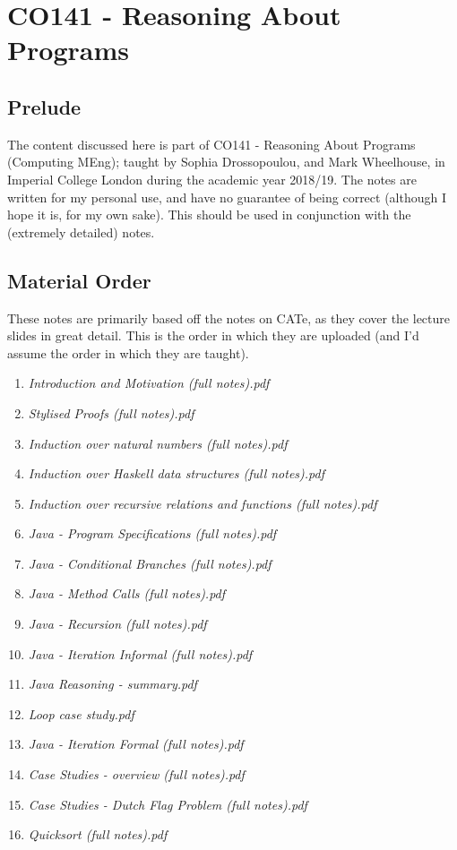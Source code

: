 \documentclass[a4paper, 12pt]{article}
\begin{document}
    \section*{CO141 - Reasoning About Programs}
        \subsection*{Prelude}
            The content discussed here is part of CO141 - Reasoning About Programs (Computing MEng); taught by Sophia Drossopoulou, and Mark Wheelhouse, in Imperial College London during the academic year 2018/19. The notes are written for my personal use, and have no guarantee of being correct (although I hope it is, for my own sake). This should be used in conjunction with the (extremely detailed) notes.
        \subsection*{Material Order}
            These notes are primarily based off the notes on CATe, as they cover the lecture slides in great detail. This is the order in which they are uploaded (and I'd assume the order in which they are taught).
            \begin{enumerate}[1.]
                \itemsep0em
                \item \textit{Introduction and Motivation (full notes).pdf}
                \item \textit{Stylised Proofs (full notes).pdf}
                \item \textit{Induction over natural numbers (full notes).pdf}
                \item \textit{Induction over Haskell data structures (full notes).pdf}
                \item \textit{Induction over recursive relations and functions (full notes).pdf}
                \item \textit{Java - Program Specifications (full notes).pdf}
                \item \textit{Java - Conditional Branches (full notes).pdf}
                \item \textit{Java - Method Calls (full notes).pdf}
                \item \textit{Java - Recursion (full notes).pdf}
                \item \textit{Java - Iteration Informal (full notes).pdf}
                \item \textit{Java Reasoning - summary.pdf}
                \item \textit{Loop case study.pdf}
                \item \textit{Java - Iteration Formal (full notes).pdf}
                \item \textit{Case Studies - overview (full notes).pdf}
                \item \textit{Case Studies - Dutch Flag Problem (full notes).pdf}
                \item \textit{Quicksort (full notes).pdf}
            \end{enumerate}
\end{document}
